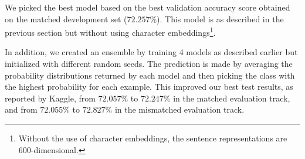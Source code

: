 \documentclass[11pt,letterpaper]{article}
\begin{document}
\begin{table}[htb]
\centering
{}
\caption{Validation accuracies (\%) for our best model broken down by genre. Both CBOW and ESIM results are reported as in \cite{williams2017broad}.}
\label{results-table}
\end{table}

We picked the best model based on the best validation accuracy score obtained on the matched development set ($72.257\%$). This model is as described in the previous section but without using character embeddings\footnote{Without the use of character embeddings, the sentence representations are 600-dimensional.}.

In addition, we created an ensemble by training 4 models as described earlier but initialized with different random seeds. The prediction is made by averaging the probability distributions returned by each model and then picking the class with the highest probability for each example. This improved our best test results, as reported by Kaggle, from $72.057\%$ to $72.247\%$ in the matched evaluation track, and from $72.055\%$ to $72.827\%$ in the mismatched evaluation track.
\end{document}
